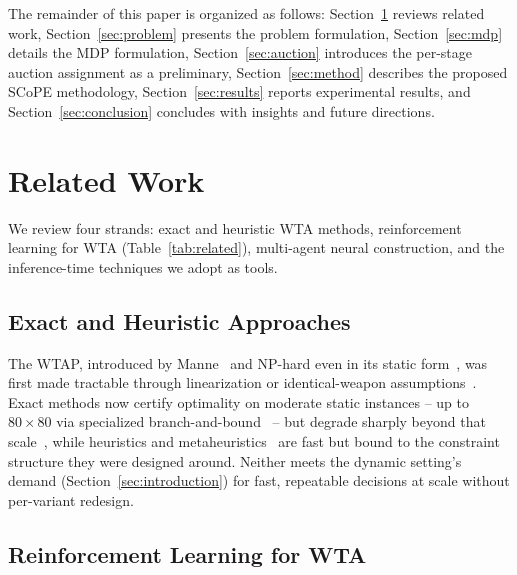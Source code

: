 The remainder of this paper is organized as follows: Section~\ref{sec:related} reviews related work, Section~\ref{sec:problem} presents the problem formulation, Section~\ref{sec:mdp} details the MDP formulation, Section~\ref{sec:auction} introduces the per-stage auction assignment as a preliminary, Section~\ref{sec:method} describes the proposed SCoPE methodology, Section~\ref{sec:results} reports experimental results, and Section~\ref{sec:conclusion} concludes with insights and future directions.

\section{Related Work}
\label{sec:related}

We review four strands: exact and heuristic WTA methods, reinforcement learning for WTA (Table~\ref{tab:related}), multi-agent neural construction, and the inference-time techniques we adopt as tools.

\subsection{Exact and Heuristic Approaches}

The WTAP, introduced by Manne~\cite{manne1958target} and NP-hard even in its static form~\cite{lloyd1986weapons}, was first made tractable through linearization or identical-weapon assumptions~\cite{day1966allocating,firstman1960approximating,hodson1971linear,bracken1968selected,denbroeder1959optimum}. Exact methods now certify optimality on moderate static instances -- up to $80\times80$ via specialized branch-and-bound~\cite{ahuja2007exact} -- but degrade sharply beyond that scale~\cite{johansson2009empirical,kline2019weapon}, while heuristics and metaheuristics~\cite{kolitz1988analysis,lee2002immunity,lee2003efficiently,lee2003genetic,durgut2017artificial,sonuc2017parallel,chang2018solving,metler1990suite} are fast but bound to the constraint structure they were designed around. Neither meets the dynamic setting's demand (Section~\ref{sec:introduction}) for fast, repeatable decisions at scale without per-variant redesign.

\subsection{Reinforcement Learning for WTA}

